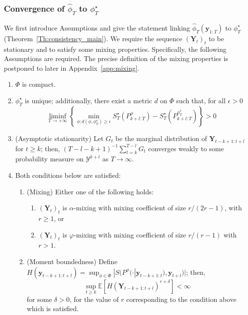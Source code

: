 \documentclass[twoside,11pt]{article}
\newcommand{\E}{\mathbb{E}}
\newcommand{\ddobs}{\mathbf{y}}
\newcommand{\Ddobs}{\mathbf{Y}}
\newcommand{\ddobsupT}{\mathbf{y}_{1:T}}
\begin{document}
	\subsubsection{Convergence of $ \hat \phi_T $ to $ \phi^\star_T $}\label{app:consistency_statement_part_1}
	We first introduce Assumptions and give the statement linking $ 	\hat \phi_T(\ddobsupT) $ to $ \phi^\star_T $ (Theorem~\ref{Th:consistency_main}). We require the sequence $ (\Ddobs_t)_t $ to be stationary and to satisfy some mixing properties. Specifically, the following Assumptions are required. The precise definition of the mixing properties is postponed to later in Appendix~\ref{app:mixing}.	\begin{enumerate}[label=\textbf{A\arabic*}]
		\item \label{ass:B1} $ \Phi $ is compact.
		\item \label{ass:A1} $ \phi^\star_T $ is unique; additionally, there exist a metric $ d $ on $ \Phi $ such that, for all $ \epsilon>0 $
		\begin{equation}\label{}
		\liminf_{T\to+\infty} \left\{ \min_{\phi: d(\phi, {\phi^\star_T})\ge\epsilon} S_T^\star(P_{k+l:T}^\phi) - S_T^\star(P_{k+l:T}^{\phi^\star_T})    \right\} >0
		\end{equation}
		\item \label{ass:A3} (Asymptotic stationarity) Let $ G_t $ be the marginal distribution of $ \Ddobs_{t-k+1:t+l} $ for $ t\ge k $; then, $ (T-l-k+1)^{-1} \sum_{t=k}^{T-l} G_t $ converges weakly to some probability measure on $ \mathcal{Y}^{k+l} $ as $ T \to\infty$.
		\item \label{ass:A4} Both conditions below are satisfied:
		\begin{enumerate}
			\item (Mixing) Either one of the following holds: 
			\begin{enumerate}
				\item $ (\Ddobs_t)_t $ is $ \alpha $-mixing with mixing coefficient of size $ r/(2r-1) $, with $ r \ge 1 $, or
				\item $ (\Ddobs_t)_t $ is $ \varphi $-mixing with mixing coefficient of size $ r/(r-1) $ with $ r > 1 $.
			\end{enumerate}
			\item (Moment boundedness) Define $ H(\ddobs_{t-k+1:t+l}) = \sup_{\phi \in \Phi } |S(P^\phi(\cdot|\ddobs_{t-k+1:t}), \ddobs_{t+l})| $; then, $$ \sup_{t\ge k} \E\left[H(\Ddobs_{t-k+1:t+l})^{r+\delta}\right] <\infty$$ for some $ \delta>0 $, for the value of $ r $ corresponding to the condition above which is satisfied.
		\end{enumerate}
	\end{enumerate}
\end{document}
